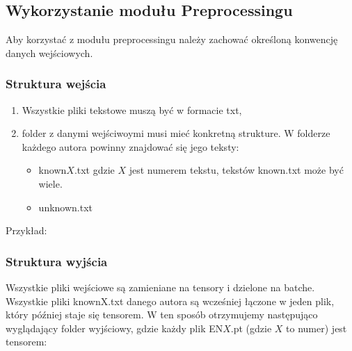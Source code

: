 \newpage
\subsection{Wykorzystanie modułu Preprocessingu}

Aby korzystać z modułu preprocessingu należy zachować określoną konwencję danych wejściowych. 

\subsubsection{Struktura wejścia}

\begin{enumerate}
	\item Wszystkie pliki tekstowe muszą być w formacie txt,
	\item folder z danymi wejściwoymi musi mieć konkretną strukture. W folderze każdego autora
		  powinny znajdować się jego teksty: 
			\begin{itemize}
				\item known$X$.txt gdzie $X$ jest numerem tekstu, tekstów known.txt może być wiele.
				\item unknown.txt
			\end{itemize}
\end{enumerate}

Przykład: 

\myspace
{}
\myspace

\newpage
\subsubsection{Struktura wyjścia}

Wszystkie pliki wejściowe są zamieniane na tensory i dzielone na batche. Wszystkie pliki knownX.txt 
danego autora są wcześniej łączone w jeden plik, który później staje się tensorem. W ten sposób 
otrzymujemy następująco wyglądający folder wyjściowy, gdzie każdy plik EN$X$.pt (gdzie $X$ to numer)
 jest tensorem:

\myspace
{}
\myspace


